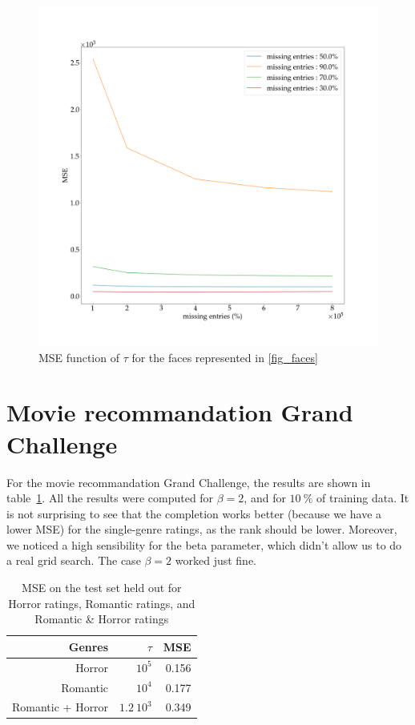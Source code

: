 \documentclass[12pt,a4paper,onecolumn]{article}
\begin{document}
\begin{figure}[H]
	\includegraphics[width = 1.0\textwidth]{2_curve.png}
	\caption{MSE function of \(\tau\) for the faces represented in \ref{fig_faces}}
	\label{fig_curve}
\end{figure}

\section{Movie recommandation Grand Challenge}

For the movie recommandation Grand Challenge, the results are shown in table~\ref{tab_moovie}. All the results were computed for \(\beta = 2\), and for \(10~\%\) of training data. It is not surprising to see that the completion works better (because we have a lower MSE) for the single-genre ratings, as the rank should be lower. Moreover, we noticed a high sensibility for the beta parameter, which didn't allow us to do a real grid search. The case \(\beta = 2\) worked just fine.

\begin{table}
	\centering
	\begin{tabular}{r | r | r}
		\hline
		Genres            & \(\tau\)     & MSE   \\\hline
		Horror            & \(10^5\)     & 0.156 \\\hline
		Romantic          & \(10^4\)     & 0.177 \\\hline
		Romantic + Horror & \(1.2~10^3\) & 0.349 \\\hline
	\end{tabular}
	\caption{MSE on the test set held out for Horror ratings, Romantic ratings, and Romantic \& Horror ratings}
	\label{tab_moovie}
\end{table}

\printbibliography
\end{document}
